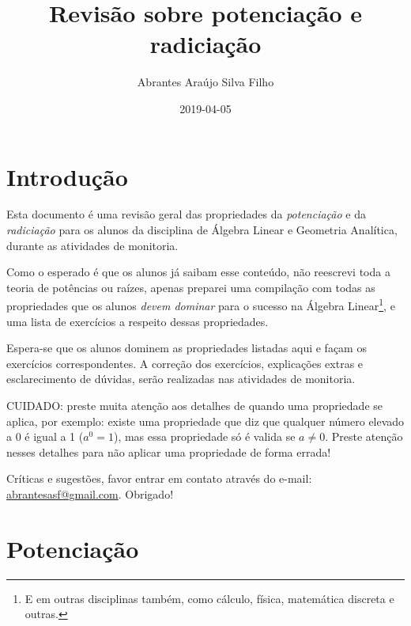 \documentclass[pdftex, brazil, 12pt, oneside]{article}
\begin{document}
\title{Revisão sobre potenciação e radiciação}
\author{Abrantes Araújo Silva Filho}
\date{2019-04-05}
\maketitle
\tableofcontents




\section{Introdução}
\label{intro}

Esta documento é uma revisão geral das propriedades da
\emph{potenciação} e da \emph{radiciação} para os alunos da disciplina
de Álgebra Linear e Geometria Analítica, durante as atividades de
monitoria.

Como o esperado é que os alunos já saibam esse conteúdo, não reescrevi
toda a teoria de potências ou raízes, apenas preparei uma compilação
com todas as propriedades que os alunos \emph{devem dominar} para o
sucesso na Álgebra Linear\footnote{E em outras disciplinas também,
  como cálculo, física, matemática discreta e outras.}, e uma lista de
exercícios a respeito dessas propriedades.

Espera-se que os alunos dominem as propriedades listadas aqui e façam
os exercícios correspondentes. A correção dos exercícios, explicações
extras e esclarecimento de dúvidas, serão realizadas nas atividades de
monitoria.

CUIDADO: preste muita atenção aos detalhes de quando uma propriedade
se aplica, por exemplo: existe uma propriedade que diz que qualquer
número elevado a 0 é igual a 1 ($a^0 = 1$), mas essa propriedade só é
valida se $a \ne 0$. Preste atenção nesses detalhes para não aplicar
uma propriedade de forma errada!

Críticas e sugestões, favor entrar em contato através do e-mail:
\url{abrantesasf@gmail.com}. Obrigado!




\section{Potenciação}
\label{potenciacao}
\end{document}

